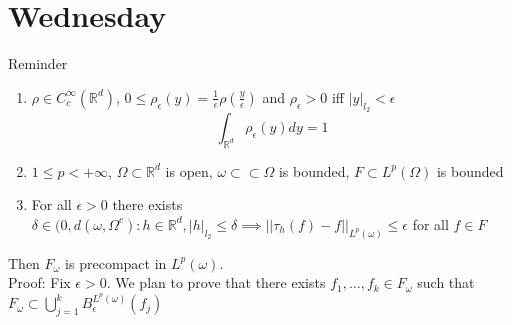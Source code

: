 \documentclass[11pt]{article}
\begin{document}
\section{Wednesday}
Reminder
\begin{enumerate}
    \item $\rho \in C_c^{\infty}( \mathbb{R}^{d})$, $0 \le \rho_\epsilon(y) = \frac{1}{\epsilon} \rho(\frac{y}{\epsilon})$ and $\rho_\epsilon > 0$ iff $|y|_{l_2} < \epsilon$
        \[
        \int_{ \mathbb{R}^{d}}^{}\rho_\epsilon(y)dy = 1
        \] 
    \item $1 \le p < +\infty$, $\Omega \subset \mathbb{R}^{d}$ is open, $\omega \subset \subset \Omega$ is bounded, $F \subset L^{p}(\Omega) $ is bounded
    \item For all $\epsilon > 0$ there exists $\delta \in (0, d(\omega,\Omega^{c}) : h \in \mathbb{R}^{d}, |h|_{l_2} \le \delta \implies ||\tau_h(f) - f||_{L^{p}(\omega)} \le \epsilon$ for all $f \in F$
\end{enumerate}
Then $F_\omega$ is precompact in  $L^{p}(\omega)$.\\
Proof: Fix $\epsilon > 0$. We plan to prove that there exists $f_1,\dots,f_k \in F_\omega$ such that $F_\omega \subset \bigcup_{j=1}^{k}B^{L^{p}(\omega)}_\epsilon(f_j)$
\end{document}
